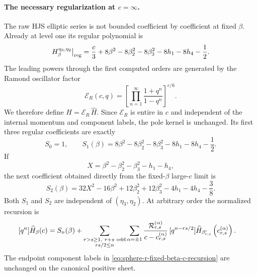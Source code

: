 \documentclass[11pt]{article}
\begin{document}
\paragraph{The necessary regularization at \(c=\infty\).}
The raw HJS elliptic series is not bounded coefficient by coefficient at
fixed \(\beta\).  Already at level one its regular polynomial is
\begin{equation}
 [q]H_{\beta}^{\eta_3,\eta_2}\big|_{\rm reg}
 =
 \frac c3
{}+8\beta^2-8\beta_2^2-8\beta_3^2
-8h_1-8h_4-\frac12 .
 \label{eq:sphere-r-raw-level-one-seed}
\end{equation}
The leading powers through the first computed orders are generated by the
Ramond oscillator factor
\begin{equation}
 \mathcal E_R(c,q)
 =
 \left[
 \prod_{n=1}^{\infty}
 \frac{1+q^n}{1-q^n}
 \right]^{c/6}.
 \label{eq:sphere-r-oscillator-factor}
\end{equation}
We therefore define
\(H=\mathcal E_R\,\widehat H\).  Since \(\mathcal E_R\) is entire in \(c\)
and independent of the internal momentum and component labels, the pole
kernel is unchanged.  Its first three regular coefficients are exactly
\begin{equation}
 S_0=1,\qquad
 S_1(\beta)
 =
 8\beta^2-8\beta_2^2-8\beta_3^2
 -8h_1-8h_4-\frac12 .
 \label{eq:sphere-r-normalized-seed-one}
\end{equation}
If
\begin{equation}
 X=\beta^2-\beta_2^2-\beta_3^2-h_1-h_4,
\end{equation}
the next coefficient obtained directly from the fixed-\(\beta\)
large-\(c\) limit is
\begin{equation}
 S_2(\beta)
 =
 32X^2-16\beta^2+12\beta_2^2+12\beta_3^2
 -4h_1-4h_4-\frac38 .
 \label{eq:sphere-r-normalized-seed-two}
\end{equation}
Both \(S_1\) and \(S_2\) are independent of
\((\eta_3,\eta_2)\).
At arbitrary order the normalized recursion is
\begin{equation}
 \begin{split}
 [q^n]\widehat H_\beta(c)
 ={}&S_n(\beta)
 +\sum_{\substack{r>s\geq1,\ r+s\ {\rm odd}\\rs/2\leq n}}
 \sum_{\alpha=\pm1}
 \frac{\mathcal R_{r,s}^{(\alpha)}}
 {c-c_{r,s}^{(\alpha)}}\,
 [q^{n-rs/2}]
 \widehat H_{\beta'_{r,s}}
 \left(c_{r,s}^{(\alpha)}\right).
 \end{split}
 \label{eq:sphere-r-fixed-beta-c-recursion}
\end{equation}
The endpoint component labels in
\eqref{eq:sphere-r-fixed-beta-c-recursion} are unchanged on the canonical
positive sheet.
\end{document}
